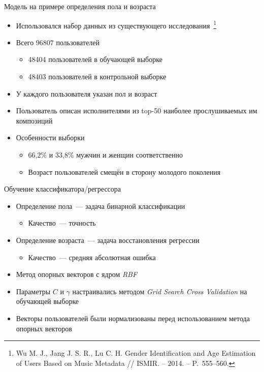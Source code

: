 \documentclass{beamer}
\begin{document}
\begin{frame}{Модель на примере определения пола и возраста}
    \begin{itemize}
        \item {Использовался набор данных из существующего 
              исследования~\footnote{Wu M. J.,
              Jang J. S. R., Lu C. H. Gender Identification
              and Age Estimation of Users Based on Music 
              Metadata // ISMIR. – 2014. – P.~555--560.}}
        \item {Всего $96807$ пользователей}
            \begin{itemize}
                \item {48404 пользователей в обучающей выборке}
                \item {48403 пользователей в контрольной выборке}
            \end{itemize}
        \item {У каждого пользователя указан пол и возраст}
        \item {Пользователь описан исполнителями из top-50 наиболее
            прослушиваемых им композиций}
        \item {Особенности выборки}
            \begin{itemize}
                \item {66{,}2\% и 33{,}8\% мужчин и женщин соответственно}
                \item {Возраст пользователей смещён в сторону молодого поколения}
            \end{itemize}
    \end{itemize}
\end{frame}

\begin{frame}{Обучение классификатора/регрессора}
  \begin{itemize}
      \item {Определение пола~--- задача бинарной классификации}
          \begin{itemize}
              \item {Качество~--- точность}
          \end{itemize}
      \item {Определение возраста~--- задача восстановления регрессии}
          \begin{itemize}
              \item {Качество~--- средняя абсолютная ошибка}
          \end{itemize}
      \item {Метод опорных векторов с ядром \textit{RBF}}
      \item {Параметры $C$ и $\gamma$ настраивались методом \textit{Grid Search Cross Validation} на обучающей выборке}
      \item {Векторы пользователей были нормализованы перед использованием метода опорных векторов}
  \end{itemize}
\end{frame}
\end{document}
